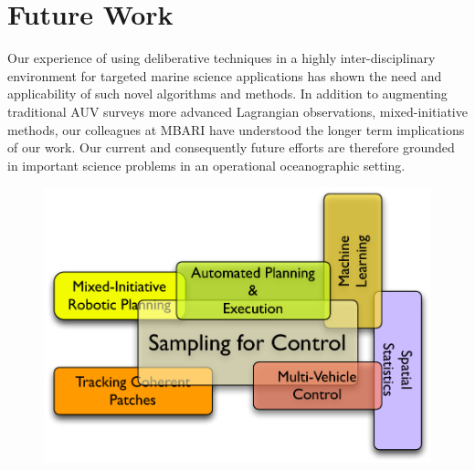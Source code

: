 \section{Future Work}
\label{sec:future}

Our experience of using deliberative techniques in a highly
inter-disciplinary environment for targeted marine science
applications has shown the need and applicability of such novel
algorithms and methods. In addition to augmenting traditional AUV
surveys more advanced Lagrangian observations, mixed-initiative
methods, our colleagues at MBARI have understood the longer term
implications of our work. Our current and consequently future efforts
are therefore grounded in important science problems in an operational
oceanographic setting.

\begin{figure}[h]
  \centering
  \includegraphics[scale=0.45]{figs/autonomy-topics.pdf}
  \caption{\small }
  \label{fig:topics}
\end{figure}

